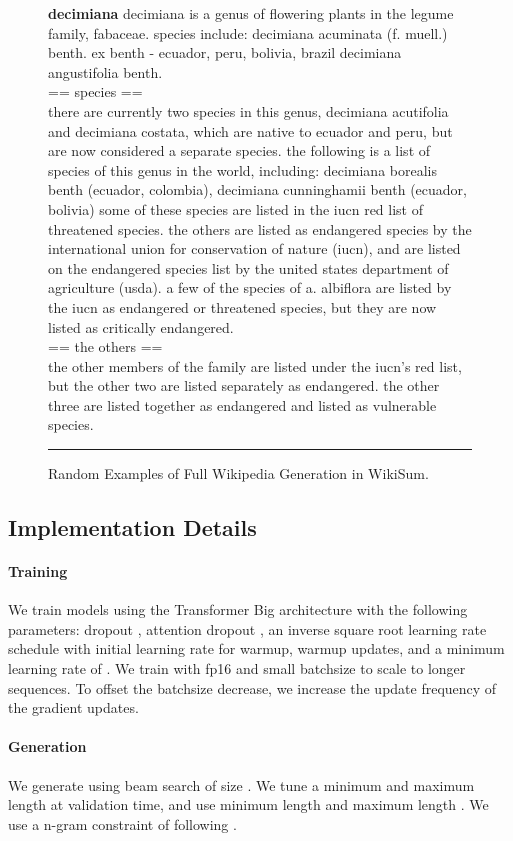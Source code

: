 \documentclass[11pt,a4paper]{article}
\begin{document}
\begin{figure*}[t]
    \noindent \textbf{decimiana} decimiana is a genus of flowering plants in the legume family, fabaceae. species include: decimiana acuminata (f. muell.) benth. ex benth - ecuador, peru, bolivia, brazil decimiana angustifolia benth. \\
    == species == \\ there are currently two species in this genus, decimiana acutifolia and decimiana costata, which are native to ecuador and peru, but are now considered a separate species. the following is a list of species of this genus in the world, including:  decimiana borealis benth (ecuador, colombia), decimiana cunninghamii benth (ecuador, bolivia) some of these species are listed in the iucn red list of threatened species. the others are listed as endangered species by the international union for conservation of nature (iucn), and are listed on the endangered species list by the united states department of agriculture (usda). a few of the species of a. albiflora are listed by the iucn as endangered or threatened species, but they are now listed as critically endangered. \\ 
    == the others == \\ the other members of the family are listed under the iucn's red list, but the other two are listed separately as endangered. the other three are listed together as endangered and listed as vulnerable species. \\
  \rule{\linewidth}{1pt}
  \caption{Random Examples of Full Wikipedia Generation in WikiSum.}
  \label{fig:examples_wikipedia_generation}
\end{figure*} 

\subsection{Implementation Details} 

\paragraph{Training} We train models using the Transformer Big architecture with the following parameters: dropout , attention dropout , an inverse square root learning rate schedule with initial learning rate  for warmup,  warmup updates, and a minimum learning rate of . We train with fp16 and small batchsize to scale to longer sequences. To offset the batchsize decrease, we increase the update frequency of the gradient updates. 

\paragraph{Generation} We generate using beam search of size . We tune a minimum and maximum length at validation time, and use minimum length  and maximum length . We use a n-gram constraint of  following \cite{fan2019explain}.  
\end{document}
